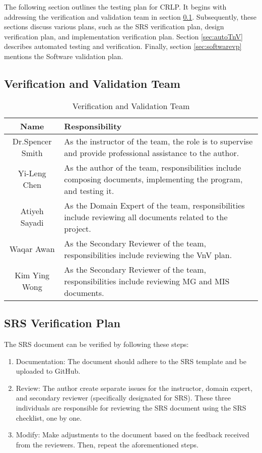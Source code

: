 \documentclass[12pt, titlepage]{article}
\begin{document}
The following section outlines the testing plan for CRLP. It begins with addressing the verification and validation team in section \ref{sec:vnvteam}. Subsequently, these sections discuss various plans, such as the SRS verification plan, design verification plan, and implementation verification plan. Section \ref{sec:autoTnV} describes automated testing and verification. Finally, section \ref{sec:softwarevp} mentions the Software validation plan.

\subsection{Verification and Validation Team} \label{sec:vnvteam}

\begin{table}
    \centering
    \begin{tabular}{|c|p{13cm}|} 
    \hline
        Name & Responsibility  \\
    \hline
        Dr.Spencer Smith & As the instructor of the team, the role is to supervise and provide professional assistance to the author.\\
    \hline
        Yi-Leng Chen & As the author of the team, responsibilities include composing documents, implementing the program, and testing it.\\
    \hline
        Atiyeh Sayadi & As the Domain Expert of the team, responsibilities include reviewing all documents related to the project.  \\
    \hline
        Waqar Awan & As the Secondary Reviewer of the team, responsibilities include reviewing the VnV plan.\\
    \hline
        Kim Ying Wong & As the Secondary Reviewer of the team, responsibilities include reviewing MG and MIS documents. \\
    \hline
    \end{tabular}
    \caption{Verification and Validation Team}
    \label{tab:VnVTeam}
\end{table}

\subsection{SRS Verification Plan}
The SRS document can be verified by following these steps:
\begin{enumerate}
    \item Documentation: The document should adhere to the SRS template \cite{srstem} and be uploaded to GitHub.
    \item Review: The author create separate issues for the instructor, domain expert, and secondary reviewer (specifically designated for SRS).
    These three individuals are responsible for reviewing the SRS document using the SRS checklist\cite{srscheck}, one by one.
    \item Modify: Make adjustments to the document based on the feedback received from the reviewers. Then, repeat the aforementioned steps.
    
\end{enumerate}
\end{document}
